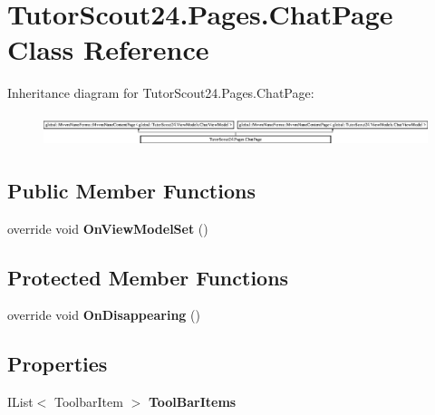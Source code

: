 \hypertarget{class_tutor_scout24_1_1_pages_1_1_chat_page}{}\section{Tutor\+Scout24.\+Pages.\+Chat\+Page Class Reference}
\label{class_tutor_scout24_1_1_pages_1_1_chat_page}
Inheritance diagram for Tutor\+Scout24.\+Pages.\+Chat\+Page\+:\begin{figure}[H]
\begin{center}
\leavevmode
\includegraphics[height=0.924092cm]{class_tutor_scout24_1_1_pages_1_1_chat_page}
\end{center}
\end{figure}
\subsection*{Public Member Functions}
\begin{DoxyCompactItemize}
\item 
\mbox{\label{class_tutor_scout24_1_1_pages_1_1_chat_page_a26b6bfc3220e6bda3d43dfa7dd1845c0}} 
override void {\bfseries On\+View\+Model\+Set} ()
\end{DoxyCompactItemize}
\subsection*{Protected Member Functions}
\begin{DoxyCompactItemize}
\item 
\mbox{\label{class_tutor_scout24_1_1_pages_1_1_chat_page_a2135ebdb49a45c57135aec0f2565d352}} 
override void {\bfseries On\+Disappearing} ()
\end{DoxyCompactItemize}
\subsection*{Properties}
\begin{DoxyCompactItemize}
\item 
\mbox{\label{class_tutor_scout24_1_1_pages_1_1_chat_page_aac4a388f41564f9a6e02c6f9ace4607a}} 
I\+List$<$ Toolbar\+Item $>$ {\bfseries Tool\+Bar\+Items}
\end{DoxyCompactItemize}


